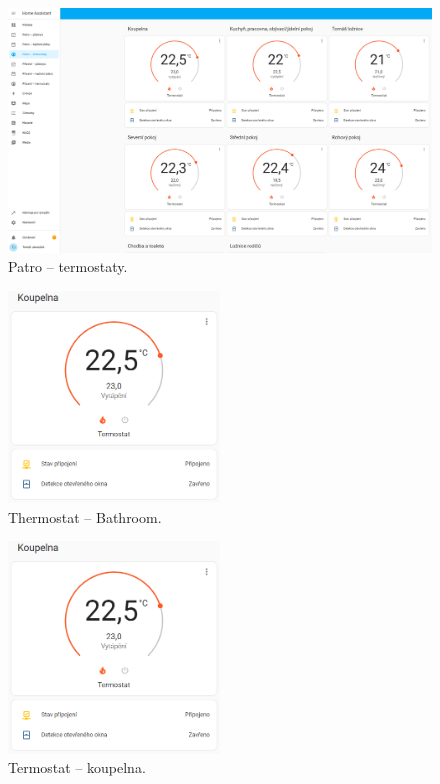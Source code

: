 \begin{Czech}
\begin{figure}[H]
    \centering
    \includegraphics[width=1\textwidth]{pictures/czech/software/thermostats-first-floor.png}
    \caption{Patro – termostaty.}
    \label{fig:thermostats-first-floor}
\end{figure}
\end{Czech}


\begin{English}
\begin{figure}[H]
    \centering
    \includegraphics[width=0.5\textwidth]{pictures/czech/software/thermostat.png}
    \caption{Thermostat – Bathroom.}
    \label{fig:thermostat}
\end{figure}
\end{English}

\begin{Czech}
\begin{figure}[H]
    \centering
    \includegraphics[width=0.5\textwidth]{pictures/czech/software/thermostat.png}
    \caption{Termostat – koupelna.}
    \label{fig:thermostat}
\end{figure}
\end{Czech}


